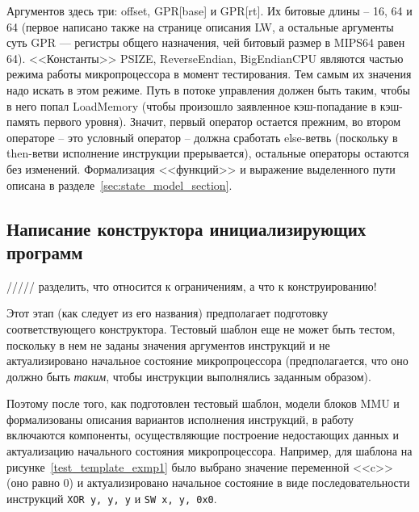 Аргументов здесь три: offset, GPR[base] и GPR[rt]. Их битовые длины -- 16, 64 и
64 (первое написано также на странице описания LW, а остальные аргументы суть
GPR --- регистры общего назначения, чей битовый размер в MIPS64 равен 64).
<<Константы>> PSIZE, ReverseEndian, BigEndianCPU являются частью режима работы
микропроцессора в момент тестирования. Тем самым их значения надо искать в этом
режиме. Путь в потоке управления должен быть таким, чтобы в него попал
LoadMemory (чтобы произошло заявленное кэш-попадание в кэш-память первого
уровня). Значит, первый оператор остается прежним, во втором операторе -- это
условный оператор -- должна сработать else-ветвь (поскольку в then-ветви
исполнение инструкции прерывается), остальные операторы остаются без изменений.
Формализация <<функций>> и выражение выделенного пути описана в
разделе~\ref{sec:state_model_section}.


\subsection{Написание конструктора инициализирующих программ}

///// разделить, что относится к ограничениям, а что к конструированию!

Этот этап (как следует из его названия) предполагает подготовку соответствующего конструктора. Тестовый шаблон еще не может быть
тестом, поскольку в нем не заданы значения аргументов инструкций и не
актуализировано начальное состояние микропроцессора (предполагается, что оно должно быть \emph{таким}, чтобы инструкции выполнялись заданным образом).

Поэтому после того, как подготовлен тестовый шаблон, модели блоков MMU и формализованы описания вариантов исполнения инструкций, в работу включаются компоненты, осуществляющие построение недостающих данных и актуализацию начального состояния микропроцессора. Например, для шаблона на рисунке~\ref{test_template_exmp1} было выбрано значение переменной <<c>> (оно равно 0) и актуализировано начальное состояние в виде последовательности инструкций \texttt{XOR y, y, y} и \texttt{SW x, y, 0x0}.

